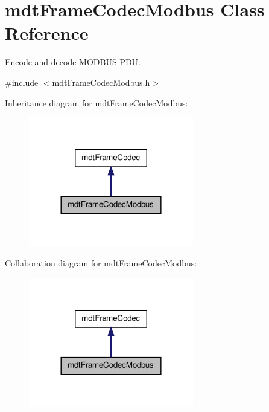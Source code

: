 \hypertarget{classmdt_frame_codec_modbus}{
\section{mdtFrameCodecModbus Class Reference}
\label{classmdt_frame_codec_modbus}
}


Encode and decode MODBUS PDU.  




{\ttfamily \#include $<$mdtFrameCodecModbus.h$>$}



Inheritance diagram for mdtFrameCodecModbus:\nopagebreak
\begin{figure}[H]
\begin{center}
\leavevmode
\includegraphics[width=204pt]{classmdt_frame_codec_modbus__inherit__graph}
\end{center}
\end{figure}


Collaboration diagram for mdtFrameCodecModbus:\nopagebreak
\begin{figure}[H]
\begin{center}
\leavevmode
\includegraphics[width=204pt]{classmdt_frame_codec_modbus__coll__graph}
\end{center}
\end{figure}
